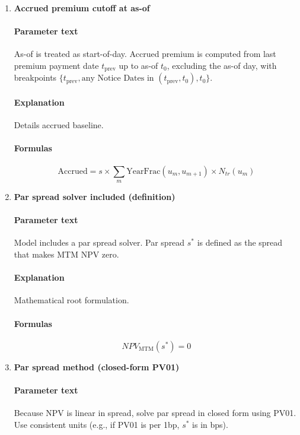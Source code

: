 \documentclass[11pt]{article}
\begin{document}
\begin{enumerate}[label=\arabic*),leftmargin=*,align=left]
\paragraph{Explanation} Prevents division by zero or NaN reporting for exhausted tranches.
\paragraph{Formulas} 
\[ NPV_{\text{MTM}} = 0, \quad \text{AccruedPremium} = 0, \quad \text{CleanPrice} = 0, \quad \text{DirtyPrice} = 0 \]

\item \textbf{Accrued premium cutoff at as-of}
\paragraph{Parameter text} As-of is treated as start-of-day. Accrued premium is computed from last premium payment date $t_{\text{prev}}$ up to as-of $t_0$, excluding the as-of day, with breakpoints $\{t_{\text{prev}}, \text{any Notice Dates in } (t_{\text{prev}}, t_0), t_0\}$.
\paragraph{Explanation} Details accrued baseline.
\paragraph{Formulas}
\[ \text{Accrued} = s \times \sum_m \text{YearFrac}(u_m, u_{m+1}) \times N_{tr}(u_m) \]

\item \textbf{Par spread solver included (definition)}
\paragraph{Parameter text} Model includes a par spread solver. Par spread $s^*$ is defined as the spread that makes MTM NPV zero.
\paragraph{Explanation} Mathematical root formulation.
\paragraph{Formulas}
\[ NPV_{\text{MTM}}(s^*) = 0 \]

\item \textbf{Par spread method (closed-form PV01)}
\paragraph{Parameter text} Because NPV is linear in spread, solve par spread in closed form using PV01. Use consistent units (e.g., if PV01 is per 1bp, $s^*$ is in bps).

\end{enumerate}
\end{document}
